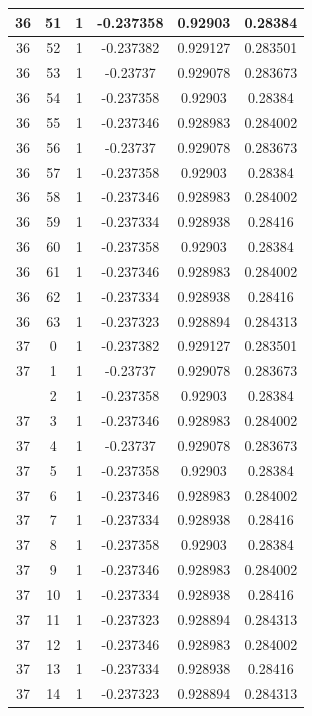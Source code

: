 \documentclass[12pt,a4paper]{article}
\numberwithin{equation}{section}
\numberwithin{figure}{section}
\numberwithin{table}{section}
\begin{document}
\begin{longtable}{|c|c|c|c|c|c|}
36 & 51 & 1 & -0.237358 & 0.92903 & 0.28384 \\ \hline
36 & 52 & 1 & -0.237382 & 0.929127 & 0.283501 \\ \hline
36 & 53 & 1 & -0.23737 & 0.929078 & 0.283673 \\ \hline
36 & 54 & 1 & -0.237358 & 0.92903 & 0.28384 \\ \hline
36 & 55 & 1 & -0.237346 & 0.928983 & 0.284002 \\ \hline
36 & 56 & 1 & -0.23737 & 0.929078 & 0.283673 \\ \hline
36 & 57 & 1 & -0.237358 & 0.92903 & 0.28384 \\ \hline
36 & 58 & 1 & -0.237346 & 0.928983 & 0.284002 \\ \hline
36 & 59 & 1 & -0.237334 & 0.928938 & 0.28416 \\ \hline
36 & 60 & 1 & -0.237358 & 0.92903 & 0.28384 \\ \hline
36 & 61 & 1 & -0.237346 & 0.928983 & 0.284002 \\ \hline
36 & 62 & 1 & -0.237334 & 0.928938 & 0.28416 \\ \hline
36 & 63 & 1 & -0.237323 & 0.928894 & 0.284313 \\ \hline
37 & 0 & 1 & -0.237382 & 0.929127 & 0.283501 \\ \hline
37 & 1 & 1 & -0.23737 & 0.929078 & 0.283673 \\ \hline
\pagebreak
37 & 2 & 1 & -0.237358 & 0.92903 & 0.28384 \\ \hline
37 & 3 & 1 & -0.237346 & 0.928983 & 0.284002 \\ \hline
37 & 4 & 1 & -0.23737 & 0.929078 & 0.283673 \\ \hline
37 & 5 & 1 & -0.237358 & 0.92903 & 0.28384 \\ \hline
37 & 6 & 1 & -0.237346 & 0.928983 & 0.284002 \\ \hline
37 & 7 & 1 & -0.237334 & 0.928938 & 0.28416 \\ \hline
37 & 8 & 1 & -0.237358 & 0.92903 & 0.28384 \\ \hline
37 & 9 & 1 & -0.237346 & 0.928983 & 0.284002 \\ \hline
37 & 10 & 1 & -0.237334 & 0.928938 & 0.28416 \\ \hline
37 & 11 & 1 & -0.237323 & 0.928894 & 0.284313 \\ \hline
37 & 12 & 1 & -0.237346 & 0.928983 & 0.284002 \\ \hline
37 & 13 & 1 & -0.237334 & 0.928938 & 0.28416 \\ \hline
37 & 14 & 1 & -0.237323 & 0.928894 & 0.284313 \\ \hline

\end{longtable}
\end{document}
